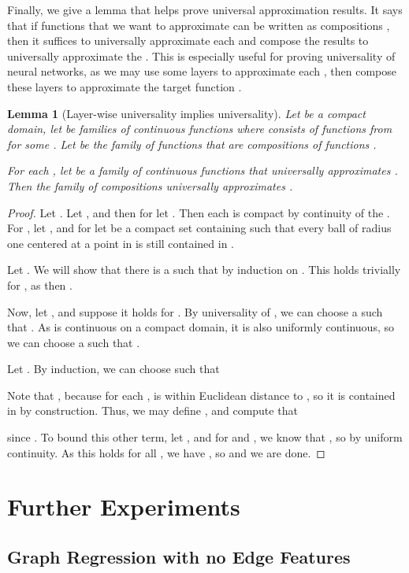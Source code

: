 \documentclass{article} \usepackage{iclr2023_conference,times}
\newtheorem{lemma}{Lemma}
\begin{document}
Finally, we give a lemma that helps prove universal approximation results. It says that if functions  that we want to approximate can be written as compositions , then it suffices to universally approximate each  and compose the results to universally approximate the . This is especially useful for proving universality of neural networks, as we may use some layers to approximate each , then compose these layers to approximate the target function .

\begin{lemma}[Layer-wise universality implies universality]\label{lem:layer_universal}
    Let  be a compact domain, let  be families of continuous functions where  consists of functions from  for some . Let  be the family of functions  that are compositions of functions .

    For each , let  be a family of continuous functions that universally approximates . Then the family of compositions  universally approximates .
\end{lemma}
\begin{proof}
    Let . Let , and then for  let . Then each  is compact by continuity of the . For , let , and for  let  be a compact set containing  such that every ball of radius one centered at a point in  is still contained in .

Let . We will show that there is a  such that  by induction on . This holds trivially for , as then .

Now, let , and suppose it holds for . By universality of , we can choose a  such that . As  is continuous on a compact domain, it is also uniformly continuous, so we can choose a  such that .

Let . By induction, we can choose  such that 

Note that , because for each ,  is within  Euclidean distance to , so it is contained in  by construction. Thus, we may define , and compute that

since . To bound this other term, let , and for  and , we know that , so  by uniform continuity. As this holds for all , we have , so  and we are done.
\end{proof}


\section{Further Experiments}

\subsection{Graph Regression with no Edge Features}\label{appendix:no_edge_features}
\end{document}
